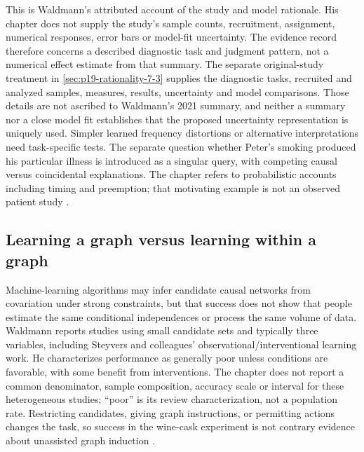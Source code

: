 This is Waldmann's attributed account of the study and model rationale.
His chapter does not supply the study's sample counts, recruitment,
assignment, numerical responses, error bars or model-fit uncertainty.
The evidence record therefore concerns a described diagnostic task and
judgment pattern, not a numerical effect estimate from that summary.
The separate original-study treatment in
\cref{sec:p19-rationality-7-3} supplies the diagnostic tasks, recruited
and analyzed samples, measures, results, uncertainty and model comparisons.
Those details are not ascribed to Waldmann's 2021 summary, and neither
a summary nor a close model fit establishes that the proposed uncertainty
representation is uniquely used.
Simpler learned frequency distortions or alternative interpretations
need task-specific tests. The separate question whether Peter's
smoking produced his particular illness is introduced as a singular
query, with competing causal versus coincidental explanations. The
chapter refers to probabilistic accounts including timing and preemption;
that motivating example is not an observed patient study
\cite[p.~443]{Waldmann2021EverydayCausal}.

\subsection{Learning a graph versus learning within a graph}

Machine-learning algorithms may infer candidate causal networks from
covariation under strong constraints, but that success does not show
that people estimate the same conditional independences or process the
same volume of data. Waldmann reports studies using small candidate
sets and typically three variables, including Steyvers and colleagues'
observational/interventional learning work. He characterizes performance
as generally poor unless conditions are favorable, with some benefit
from interventions. The chapter does not report a common denominator,
sample composition, accuracy scale or interval for these heterogeneous
studies; ``poor'' is its review characterization, not a population rate.
Restricting candidates, giving graph instructions, or permitting actions
changes the task, so success in the wine-cask experiment is not contrary
evidence about unassisted graph induction
\cite[p.~443]{Waldmann2021EverydayCausal}.

